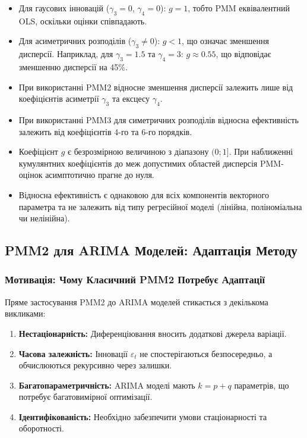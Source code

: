 \documentclass[12pt,a4paper]{article}
\begin{document}
\begin{itemize}
    \item Для гаусових інновацій ($\gamma_3 = 0$, $\gamma_4 = 0$): $g = 1$, тобто PMM еквівалентний OLS, оскільки оцінки співпадають.

    \item Для асиметричних розподілів ($\gamma_3 \neq 0$): $g < 1$, що означає зменшення дисперсії. Наприклад, для $\gamma_3 = 1.5$ та $\gamma_4 = 3$: $g \approx 0.55$, що відповідає зменшенню дисперсії на 45\%.

    \item При використанні PMM2 відносне зменшення дисперсії залежить лише від коефіцієнтів асиметрії $\gamma_3$ та ексцесу $\gamma_4$.

    \item При використанні PMM3 для симетричних розподілів відносна ефективність залежить від коефіцієнтів 4-го та 6-го порядків.

    \item Коефіцієнт $g$ є безрозмірною величиною з діапазону $(0;1]$. При наближенні кумулянтних коефіцієнтів до меж допустимих областей дисперсія PMM-оцінок асимптотично прагне до нуля.

    \item Відносна ефективність є однаковою для всіх компонентів векторного параметра та не залежить від типу регресійної моделі (лінійна, поліноміальна чи нелінійна).
\end{itemize}

\subsection{PMM2 для ARIMA Моделей: Адаптація Методу}
\label{subsec:pmm2_arima}

\subsubsection{Мотивація: Чому Класичний PMM2 Потребує Адаптації}

Пряме застосування PMM2 до ARIMA моделей стикається з декількома викликами:

\begin{enumerate}
    \item \textbf{Нестаціонарність:} Диференціювання вносить додаткові джерела варіації.

    \item \textbf{Часова залежність:} Інновації $\varepsilon_t$ не спостерігаються безпосередньо, а обчислюються рекурсивно через залишки.

    \item \textbf{Багатопараметричність:} ARIMA моделі мають $k = p + q$ параметрів, що потребує багатовимірної оптимізації.

    \item \textbf{Ідентифікованість:} Необхідно забезпечити умови стаціонарності та оборотності.
\end{enumerate}
\end{document}

